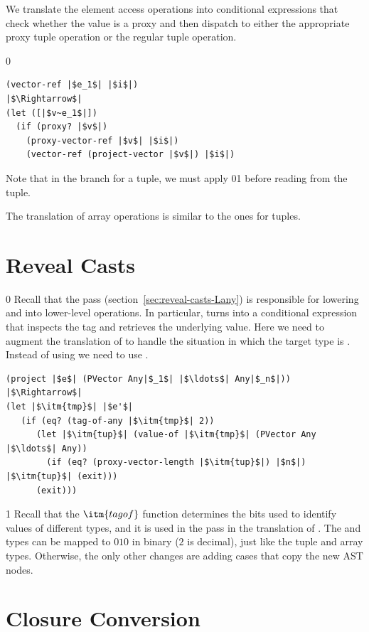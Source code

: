 \documentclass[7x10]{TimesAPriori_MIT}%
\def\racketEd{0}
\def\pythonEd{1}
\def\edition{1}
\newcommand{\racket}[1]{{\if\edition\racketEd{#1}\fi}}
\newcommand{\pythonColor}[0]{}
\newcommand{\python}[1]{{\if\edition\pythonEd\pythonColor #1\fi}}
\numberwithin{theorem}{chapter}
\numberwithin{definition}{chapter}
\numberwithin{equation}{chapter}
\begin{document}
We translate the element access operations into conditional
expressions that check whether the value is a proxy and then dispatch
to either the appropriate proxy tuple operation or the regular tuple
operation.
{\if\edition\racketEd    
\begin{lstlisting}
(vector-ref |$e_1$| |$i$|)
|$\Rightarrow$|
(let ([|$v~e_1$|])
  (if (proxy? |$v$|)
    (proxy-vector-ref |$v$| |$i$|)
    (vector-ref (project-vector |$v$|) |$i$|)
\end{lstlisting}
\fi}
%
Note that in the branch for a tuple, we must apply
\racket{}\python{} before reading
from the tuple.

The translation of array operations is similar to the ones for tuples.


\section{Reveal Casts}
\label{sec:reveal-casts-gradual}

{\if\edition\racketEd    
Recall that the  pass
(section~\ref{sec:reveal-casts-Lany}) is responsible for lowering
 and  into lower-level operations.
%
In particular,  turns into a conditional expression that
inspects the tag and retrieves the underlying value.  Here we need to
augment the translation of  to handle the situation in which
the target type is .  Instead of using
 we need to use .
\begin{lstlisting}
(project |$e$| (PVector Any|$_1$| |$\ldots$| Any|$_n$|))
|$\Rightarrow$|
(let |$\itm{tmp}$| |$e'$|
   (if (eq? (tag-of-any |$\itm{tmp}$| 2))
      (let |$\itm{tup}$| (value-of |$\itm{tmp}$| (PVector Any |$\ldots$| Any))
        (if (eq? (proxy-vector-length |$\itm{tup}$|) |$n$|) |$\itm{tup}$| (exit)))
      (exit)))
\end{lstlisting}
\fi}
%
{\if\edition\pythonEd\pythonColor
Recall that the $\itm{tagof}$ function determines the bits used to
identify values of different types, and it is used in the 
pass in the translation of . The \PTUPLETYNAME{} and
\PARRAYTYNAME{} types can be mapped to $010$ in binary ($2$ is
decimal), just like the tuple and array types.
\fi}  
%
Otherwise, the only other changes are adding cases that copy the new AST nodes.


\section{Closure Conversion}
\label{sec:closure-conversion-gradual}
\end{document}
